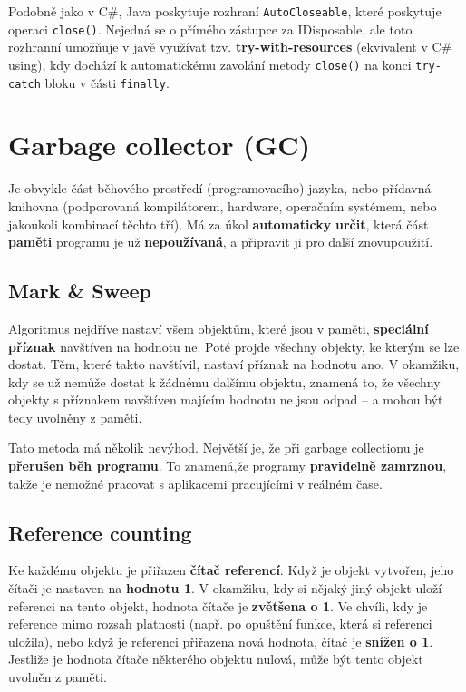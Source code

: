 Podobně jako v C\#, Java poskytuje rozhraní \texttt{AutoCloseable}, které poskytuje operaci \texttt{close()}. Nejedná se o přímého zástupce za IDisposable, ale toto rozhranní umožňuje v javě využívat tzv. \textbf{try-with-resources} (ekvivalent v C\# using), kdy dochází k automatickému zavolání metody \texttt{close()} na konci \texttt{try-catch} bloku v části \texttt{finally}.

\section{Garbage collector (GC)}
Je obvykle část běhového prostředí (programovacího) jazyka, nebo přídavná knihovna (podporovaná kompilátorem, hardware, operačním systémem, nebo jakoukoli kombinací těchto tří). Má za úkol \textbf{automaticky} \textbf{určit}, která část \textbf{paměti} programu je už \textbf{nepoužívaná}, a připravit ji pro další znovupoužití.

\subsection{Mark \& Sweep}
Algoritmus nejdříve nastaví všem objektům, které jsou v paměti, \textbf{speciální příznak} navštíven na hodnotu ne. Poté projde všechny objekty, ke kterým se lze dostat. Těm, které takto navštívil, nastaví příznak na hodnotu ano. V okamžiku, kdy se už nemůže dostat k žádnému dalšímu objektu, znamená to, že všechny objekty s příznakem navštíven majícím hodnotu ne jsou odpad -- a mohou být tedy uvolněny z paměti.

Tato metoda má několik nevýhod. Největší je, že při garbage collectionu je \textbf{přerušen běh programu}. To znamená,že programy \textbf{pravidelně zamrznou}, takže je nemožné pracovat s aplikacemi pracujícími v reálném čase.

\subsection{Reference counting}
Ke každému objektu je přiřazen \textbf{čítač referencí}. Když je objekt vytvořen, jeho čítači je nastaven na \textbf{hodnotu 1}. V okamžiku, kdy si nějaký jiný objekt uloží referenci na tento objekt, hodnota čítače je \textbf{zvětšena o 1}. Ve chvíli, kdy je reference mimo rozsah platnosti (např. po opuštění funkce, která si referenci uložila), nebo když je referenci přiřazena nová hodnota, čítač je \textbf{snížen o 1}. Jestliže je hodnota čítače některého objektu nulová, může být tento objekt uvolněn z paměti.

